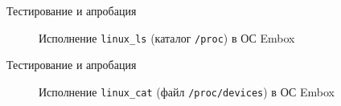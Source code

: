 \documentclass[english,russian,aspectratio=169]{beamer}
\begin{document}
\begin{frame}{Тестирование и апробация}
\begin{figure}[h]
\caption{{Исполнение \textcolor{MyGrey}{\texttt{linux\_ls}} (каталог \textcolor{MyGrey}{\texttt{/proc}}) в ОС Embox}}
\end{figure}
\end{frame}

\begin{frame}{Тестирование и апробация}
\begin{figure}[h]
\caption{Исполнение \textcolor{MyGrey}{\texttt{linux\_cat}} (файл \textcolor{MyGrey}{\texttt{/proc/devices}}) в ОС Embox}
\end{figure}
\end{frame}
\end{document}
